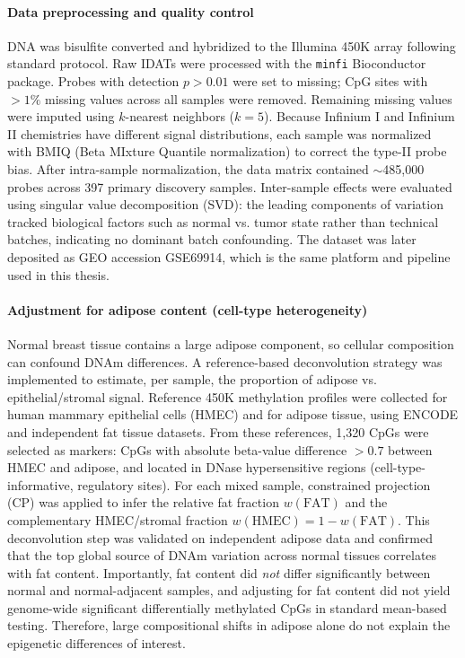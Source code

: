 \documentclass[10pt]{extarticle}
\begin{document}
\paragraph{Data preprocessing and quality control}
DNA was bisulfite converted and hybridized to the Illumina 450K array following standard protocol. Raw IDATs were processed with the \texttt{minfi} Bioconductor package. Probes with detection $p > 0.01$ were set to missing; CpG sites with $>1\%$ missing values across all samples were removed. Remaining missing values were imputed using $k$-nearest neighbors ($k=5$). Because Infinium I and Infinium II chemistries have different signal distributions, each sample was normalized with BMIQ (Beta MIxture Quantile normalization) to correct the type-II probe bias. After intra-sample normalization, the data matrix contained $\sim$485{,}000 probes across 397 primary discovery samples. Inter-sample effects were evaluated using singular value decomposition (SVD): the leading components of variation tracked biological factors such as normal vs. tumor state rather than technical batches, indicating no dominant batch confounding. The dataset was later deposited as GEO accession GSE69914, which is the same platform and pipeline used in this thesis.

\paragraph{Adjustment for adipose content (cell-type heterogeneity)}
Normal breast tissue contains a large adipose component, so cellular composition can confound DNAm differences. A reference-based deconvolution strategy was implemented to estimate, per sample, the proportion of adipose vs. epithelial/stromal signal. Reference 450K methylation profiles were collected for human mammary epithelial cells (HMEC) and for adipose tissue, using ENCODE and independent fat tissue datasets. From these references, 1{,}320 CpGs were selected as markers: CpGs with absolute beta-value difference $>0.7$ between HMEC and adipose, and located in DNase hypersensitive regions (cell-type-informative, regulatory sites). For each mixed sample, constrained projection (CP) was applied to infer the relative fat fraction $w(\text{FAT})$ and the complementary HMEC/stromal fraction $w(\text{HMEC}) = 1 - w(\text{FAT})$. This deconvolution step was validated on independent adipose data and confirmed that the top global source of DNAm variation across normal tissues correlates with fat content. Importantly, fat content did \textit{not} differ significantly between normal and normal-adjacent samples, and adjusting for fat content did not yield genome-wide significant differentially methylated CpGs in standard mean-based testing. Therefore, large compositional shifts in adipose alone do not explain the epigenetic differences of interest.
\end{document}
